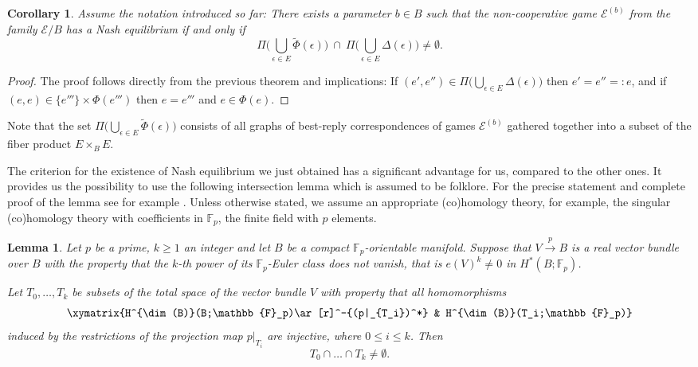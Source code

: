 \documentclass[a4paper,11pt,reqno,english]{amsart}
\theoremstyle{plain}
\newtheorem{lemma}[theorem]{Lemma}
\newtheorem{corollary}[theorem]{Corollary}
\theoremstyle{definition}
\newcommand{\Ecal}{\mathcal{E}}
\begin{document}
\begin{corollary}\label{cor:criterion_02}
	Assume the notation introduced so far: There exists a parameter $b\in B$ such that the non-cooperative game $\Ecal^{(b)}$ from the family $\Ecal/B$ has a Nash equilibrium if and only if
	\begin{displaymath}
		\Pi\big(\bigcup_{\epsilon\in E}\widetilde{\Phi} (\epsilon) \big) \ \cap \ \Pi\big(\bigcup_{\epsilon\in E} \Delta(\epsilon)\big)\neq \emptyset.
	\end{displaymath}
\end{corollary}
\begin{proof}
	The proof follows directly from the previous theorem and implications: If $(e',e'')\in \Pi\big(\bigcup_{\epsilon\in E} \Delta(\epsilon)\big)$ then $e'=e''=:e$, and if $(e,e)\in\{e'''\}\times \Phi(e''')$ then $e=e'''$ and $e\in \Phi(e)$.
\end{proof}

\medskip
Note that the set $\Pi\big(\bigcup_{\epsilon\in E}\widetilde{\Phi} (\epsilon) \big)$ consists of all graphs of best-reply correspondences of games $\Ecal^{(b)}$ gathered together into a subset of the fiber product $E\times_B E$.


\medskip
The criterion for the existence of Nash equilibrium we just obtained has a significant advantage for us, compared to the other ones.
It provides us the possibility to use the following intersection lemma which is assumed to be folklore.
For the precise statement and complete proof of the lemma see for example \cite[Lem.\,4.3]{Blagojevic2011}.
Unless otherwise stated, we assume an appropriate (co)homology theory, for example, the singular (co)homology theory with coefficients in $\mathbb{F}_p$, the finite field with $p$ elements.

\begin{lemma}\label{lem:intersection_lemma}
	Let $p$ be a prime, $k\geq 1$ an integer and let $B$ be a compact $\mathbb{F}_p$-orientable manifold.
	Suppose that $V\overset{p}{\longrightarrow} B$ is a real vector bundle over $B$ with the property that the $k$-th power of its  $\mathbb{F}_p$-Euler class does not vanish, that is $e(V)^k\neq 0$ in $H^*(B;\mathbb{F}_p)$.

	\smallskip\noindent
	Let $T_0,\dots, T_k$ be subsets of the total space of the vector bundle  $V$ with property that all homomorphisms
	\[
		\xymatrix{H^{\dim(B)}(B;\mathbb{F}_p)\ar[r]^-{(p|_{T_i})^*} & H^{\dim(B)}(T_i;\mathbb{F}_p)}
	\]
	induced by the restrictions of the projection map $p|_{T_i}$ are injective, where $0\leq i\leq k$.
	Then
	\[
		T_0\cap \dots \cap T_k\neq \emptyset.
	\]
\end{lemma}
\end{document}
